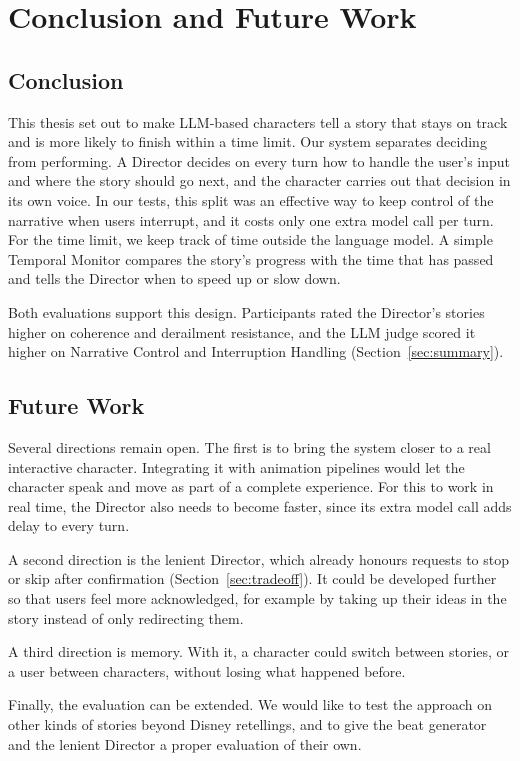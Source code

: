 \chapter{Conclusion and Future Work}\label{sec:conclusion}

\section{Conclusion}

This thesis set out to make LLM-based characters tell a story that stays on track and is more likely to finish within a time limit. Our system separates deciding from performing. A Director decides on every turn how to handle the user's input and where the story should go next, and the character carries out that decision in its own voice. In our tests, this split was an effective way to keep control of the narrative when users interrupt, and it costs only one extra model call per turn. For the time limit, we keep track of time outside the language model. A simple Temporal Monitor compares the story's progress with the time that has passed and tells the Director when to speed up or slow down.

Both evaluations support this design. Participants rated the Director's stories higher on coherence and derailment resistance, and the LLM judge scored it higher on Narrative Control and Interruption Handling (Section~\ref{sec:summary}).

\section{Future Work}

Several directions remain open. The first is to bring the system closer to a real interactive character. Integrating it with animation pipelines would let the character speak and move as part of a complete experience. For this to work in real time, the Director also needs to become faster, since its extra model call adds delay to every turn.

A second direction is the lenient Director, which already honours requests to stop or skip after confirmation (Section~\ref{sec:tradeoff}). It could be developed further so that users feel more acknowledged, for example by taking up their ideas in the story instead of only redirecting them.

A third direction is memory. With it, a character could switch between stories, or a user between characters, without losing what happened before.

Finally, the evaluation can be extended. We would like to test the approach on other kinds of stories beyond Disney retellings, and to give the beat generator and the lenient Director a proper evaluation of their own.
